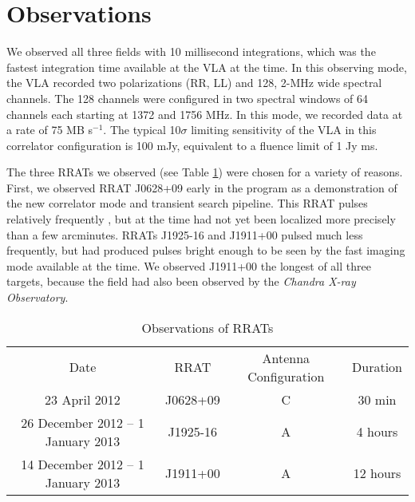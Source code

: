 \section{Observations}

We observed all three fields with 10 millisecond integrations, which was the fastest integration time available at the VLA at the time. In this observing mode, the VLA recorded two polarizations (RR, LL) and 128, 2-MHz wide spectral channels. The 128 channels were configured in two spectral windows of 64 channels each starting at 1372 and 1756 MHz. In this mode, we recorded data at a rate of 75 MB s$^{-1}$. The typical 10$\sigma$ limiting sensitivity of the VLA in this correlator configuration is 100 mJy, equivalent to a fluence limit of 1 Jy ms.

The three RRATs we observed (see Table \ref{tab:obs}) were chosen for a variety of reasons. First, we observed RRAT J0628+09 early in the program as a demonstration of the new correlator mode and transient search pipeline. This RRAT pulses relatively frequently \citep[141 bursts per hour seen by Arecibo;][]{Deneva_2009}, but at the time had not yet been localized more precisely than a few arcminutes. RRATs J1925-16 and J1911+00 pulsed much less frequently, but had produced pulses bright enough to be seen by the fast imaging mode available at the time. We observed J1911+00 the longest of all three targets, because the field had also been observed by the \emph{Chandra X-ray Observatory}.

\begin{table} 
    \begin{tabular}{ c c c c }
        Date & RRAT & Antenna Configuration & Duration \\ 
         23 April 2012 & J0628+09 & C & 30 min \\ 
         26 December 2012 -- 1 January 2013 & J1925-16 & A & 4 hours \\ 
         14 December 2012 -- 1 January 2013 & J1911+00 & A & 12 hours \\
    \end{tabular} 
    \caption{Observations of RRATs \label{tab:obs}} 
\end{table}
 
  
  
  